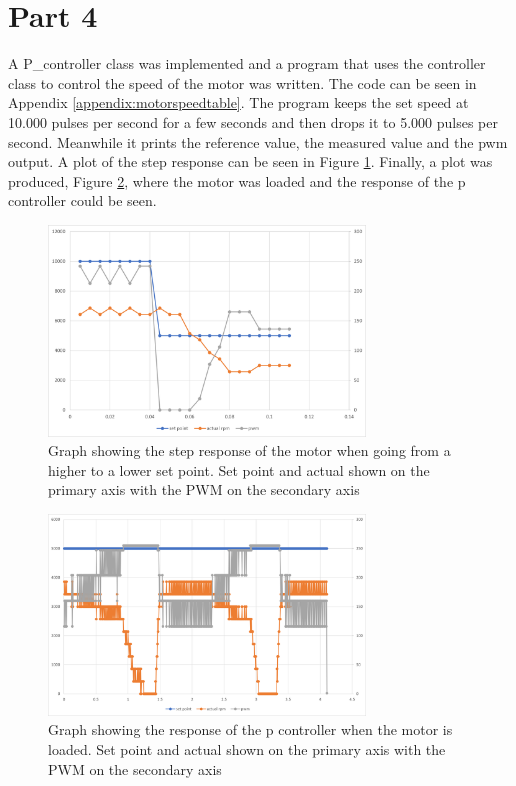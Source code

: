 \documentclass{article}
\begin{document}
\section{Part 4}
A P\_controller class was implemented and a program that uses the controller class to control the speed of the motor was written. The code can be seen in Appendix \ref{appendix:motorspeedtable}. 
The program keeps the set speed at 10.000 pulses per second for a few seconds and then drops it to 5.000 pulses per second. Meanwhile it prints the reference value, the measured value and the pwm output. A plot of the step response can be seen in Figure \ref{fig:step_response}.
    Finally, a plot was produced, Figure \ref{fig:load_response}, where the motor was loaded and the response of the p controller could be seen. 
\begin{figure}[h]
    \centering
    \includegraphics[width=0.75\textwidth]{Project2SpeedController/step_response2.png}
    \caption{Graph showing the step response of the motor when going from a higher to a lower set point. Set point and actual shown on the primary axis with the PWM on the secondary axis}
    \label{fig:step_response}
\end{figure}

\begin{figure}
    \centering
    \includegraphics[width=0.75\textwidth]{Project2SpeedController/load_response.png}
    \caption{Graph showing the response of the p controller when the motor is loaded. Set point and actual shown on the primary axis with the PWM on the secondary axis}
    \label{fig:load_response}
\end{figure}
\end{document}
